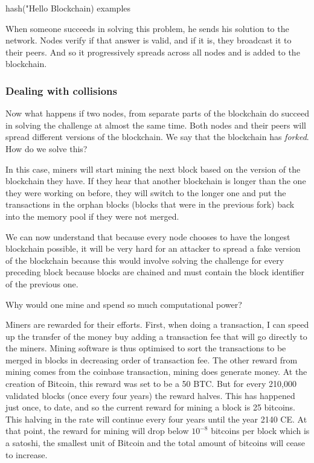 \documentclass{vldb}
\begin{document}
hash("Hello Blockchain) examples

When someone succeeds in solving this problem, he sends his solution to the network. Nodes verify if that answer is valid, and if it is, they broadcast it to their peers. And so it progressively spreads across all nodes and is added to the blockchain. 

\subsubsection{Dealing with collisions}

Now what happens if two nodes, from separate parts of the blockchain do succeed in solving the challenge at almost the same time. Both nodes and their peers will spread different versions of the blockchain. We say that the blockchain has \emph{forked}. How do we solve this?

In this case, miners will start mining the next block based on the version of the blockchain they have. If they hear that another blockchain is longer than the one they were working on before, they will switch to the longer one and put the transactions in the orphan blocks (blocks that were in the previous fork) back into the memory pool if they were not merged. 

We can now understand that because every node chooses to have the longest blockchain possible, it will be very hard for an attacker to spread a fake version of the blockchain because this would involve solving the challenge for every preceding block because blocks are chained and must contain the block identifier of the previous one. 

Why would one mine and spend so much computational power?

Miners are rewarded for their efforts. First, when doing a transaction, I can speed up the transfer of the money buy adding a transaction fee that will go directly to the miners. Mining software is thus optimised to sort the transactions to be merged in blocks in decreasing order of transaction fee. 
The other reward from mining comes from the coinbase transaction, mining does generate money.  At the creation of Bitcoin, this reward was set to be a 50 BTC. But for every 210,000 validated blocks (once every four years) the reward halves. This has happened just once, to date, and so the current reward for mining a block is 25 bitcoins. This halving in the rate will continue every four years until the year 2140 CE. At that point, the reward for mining will drop below $10^{-8}$ bitcoins per block which is a satoshi, the smallest unit of Bitcoin and the total amount of bitcoins will cease to increase.
\end{document}
